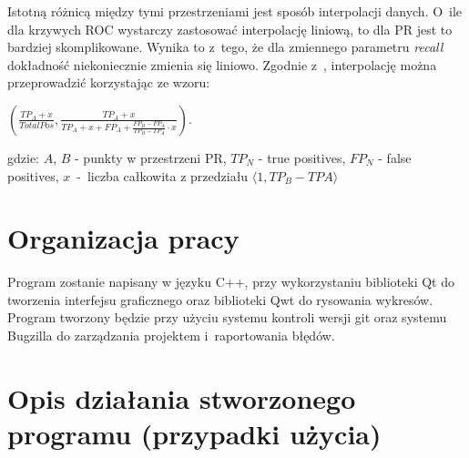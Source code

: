 \documentclass[12pt,a4paper,titlepage]{article}
\begin{document}
Istotną różnicą między tymi przestrzeniami jest sposób interpolacji danych. O~ile dla krzywych ROC wystarczy zastosować interpolację liniową, to dla PR jest to bardziej skomplikowane. Wynika to z~tego, że dla zmiennego parametru \textit{recall} dokładność niekoniecznie zmienia się liniowo. Zgodnie z~\cite{roc}, interpolację można przeprowadzić korzystając ze wzoru:\\
\begin{center}
$(\frac{TP_{A}+x}{Total Pos}, \frac{TP_{A}+x}{TP_{A}+x+FP_{A} + \frac{FP_{B}-FP_{A}}{TP_{B}-TP_{A}} \cdot x})$.
\end{center}
gdzie: $A$, $B$ - punkty w przestrzeni PR, $TP_{N}$ - true positives, $FP_{N}$ - false positives, $x$~-~liczba całkowita z przedziału $\langle 1, TP_{B}-TP{A}\rangle$
\section{Organizacja pracy}
Program zostanie napisany w języku C++, przy wykorzystaniu biblioteki Qt do tworzenia interfejsu graficznego oraz biblioteki Qwt do rysowania wykresów.
Program tworzony będzie przy użyciu systemu kontroli wersji git oraz systemu Bugzilla do zarządzania projektem i~raportowania błędów.
\section{Opis działania stworzonego programu (przypadki użycia)}
\end{document}
